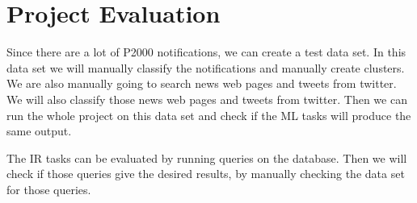 \section{Project Evaluation}
Since there are a lot of P2000 notifications, we can create a test data set. 
In this data set we will manually classify the notifications and manually create clusters. 
We are also manually going to search news web pages and tweets from twitter.
We will also classify those news web pages and tweets from twitter. 
Then we can run the whole project on this data set  and check if the ML tasks will produce the same output.

The IR tasks can be evaluated by running queries on the database. 
Then we will check if those queries give the desired results, by manually checking the data set for those queries.
